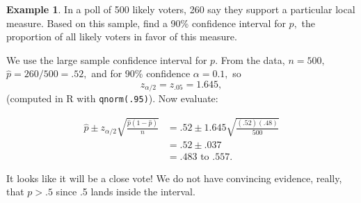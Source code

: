 \documentclass[
]{book}
\theoremstyle{definition}
\theoremstyle{definition}
\newtheorem{example}{Example}[chapter]
\theoremstyle{definition}
\theoremstyle{definition}
\theoremstyle{remark}
\begin{document}
\begin{example}
In a poll of 500 likely voters, 260 say they support a particular local measure. Based on this sample, find a 90\% confidence interval for \(p,\) the proportion of all likely voters in favor of this measure.

We use the large sample confidence interval for \(p\). From the data, \(n = 500,\) \(\hat{p} = 260/500 = .52,\) and for 90\% confidence \(\alpha = 0.1,\) so \[z_{\alpha/2} = z_{.05} = 1.645,\]
(computed in R with \texttt{qnorm(.95)}). Now evaluate:

\begin{align*}
\hat{p} \pm z_{\alpha/2} \sqrt{\frac{\hat{p}(1-\hat{p})}{n}} &= .52 \pm 1.645 \sqrt{\frac{(.52)(.48)}{500}}\\
&= .52 \pm .037\\
&= .483 \text{ to } .557.
\end{align*}

It looks like it will be a close vote! We do not have convincing evidence, really, that \(p > .5\) since .5 lands inside the interval.
\end{example}
\end{document}
